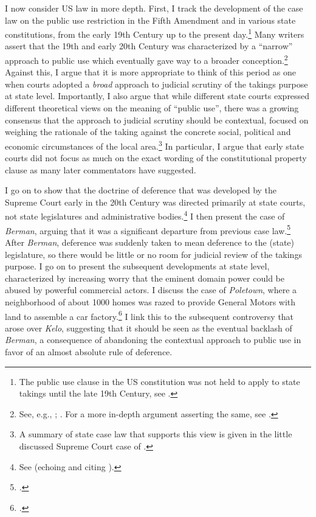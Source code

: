 \documentclass[12pt,a4paper]{book} %
\begin{document}
I now consider US law in more depth. First, I track the development of the case law on the public use restriction in the Fifth Amendment and in various state constitutions, from the early 19th Century up to the present day.\footnote{The public use clause in the US constitution was not held to apply to state takings until the late 19th Century, see \cite{chicago97}.} Many writers assert that the 19th and early 20th Century was characterized by a ``narrow'' approach to public use which eventually gave way to a broader conception.\footnote{See, e.g., \cite[483]{walt11}; \cite[203-204]{allen00}. For a more in-depth argument asserting the same, see \cite{nichols40}.} Against this, I argue that it is more appropriate to think of this period as one when courts adopted a {\it broad} approach to judicial scrutiny of the takings purpose at state level. Importantly, I also argue that while different state courts expressed different theoretical views on the meaning of ``public use'', there was a growing consensus that the approach to judicial scrutiny should be contextual, focused on weighing the rationale of the taking against the concrete social, political and economic circumstances of the local area.\footnote{A summary of state case law that supports this view is given in the little discussed Supreme Court case of \cite{hairston08}.}  In particular, I argue that early state courts did not focus as much on the exact wording of the constitutional property clause as many later commentators have suggested.

I go on to show that the doctrine of deference that was developed by the Supreme Court early in the 20th Century was directed primarily at state courts, not state legislatures and administrative bodies.\footnote{See \cite{vester30} (echoing and citing \cite{hairston08}).} I then present the case of {\it Berman}, arguing that it was a significant departure from previous case law.\footcite{berman54} After {\it Berman}, deference was suddenly taken to mean deference to the (state) legislature, so there would be little or no room for judicial review of the takings purpose. I go on to present the subsequent developments at state level, characterized by increasing worry that the eminent domain power could be abused by powerful commercial actors. I discuss the case of {\it Poletown}, where a neighborhood of about 1000 homes was razed to provide General Motors with land to assemble a car factory.\footcite{poletown81} I link this to the subsequent controversy that arose over {\it Kelo}, suggesting that it should be seen as the eventual backlash of {\it Berman}, a consequence of abandoning the contextual approach to public use in favor of an almost absolute rule of deference.
\end{document}
